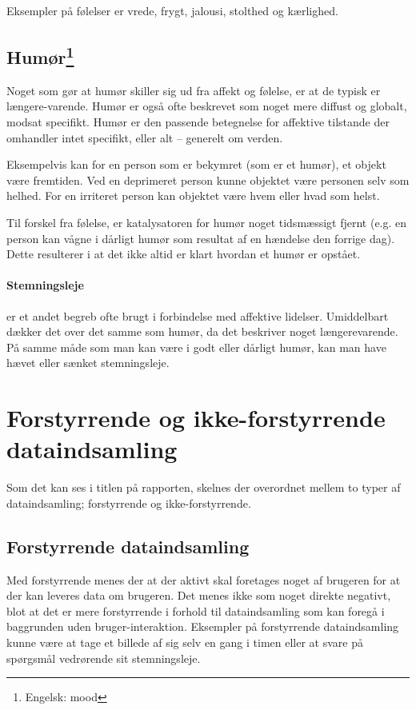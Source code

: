 Eksempler på følelser er vrede, frygt, jalousi, stolthed og kærlighed.\cite[p. 322]{ekkekakis}

\subsection[Humør]{Humør\footnote{Engelsk: mood}}
Noget som gør at humør skiller sig ud fra affekt og følelse, er at de typisk er længere-varende.
Humør er også ofte beskrevet som noget mere diffust og globalt, modsat specifikt.
Humør er den passende betegnelse for affektive tilstande der omhandler intet specifikt, eller alt -- generelt om verden.

Eksempelvis kan for en person som er bekymret (som er et humør), et objekt være fremtiden.
Ved en deprimeret person kunne objektet være personen selv som helhed.
For en irriteret person kan objektet være hvem eller hvad som helst.

Til forskel fra følelse, er katalysatoren for humør noget tidsmæssigt fjernt (e.g. en person kan vågne i dårligt humør som resultat af en hændelse den forrige dag).
Dette resulterer i at det ikke altid er klart hvordan et humør er opstået.\cite[p. 322]{ekkekakis}

\paragraph{Stemningsleje} er et andet begreb ofte brugt i forbindelse med affektive lidelser.
Umiddelbart dækker det over det samme som humør, da det beskriver noget længerevarende.
På samme måde som man kan være i godt eller dårligt humør, kan man have hævet eller sænket stemningsleje.

\section{Forstyrrende og ikke-forstyrrende dataindsamling}
Som det kan ses i titlen på rapporten, skelnes der overordnet mellem to typer af dataindsamling; forstyrrende og ikke-forstyrrende.

\subsection{Forstyrrende dataindsamling}
Med forstyrrende menes der at der aktivt skal foretages noget af brugeren for at der kan leveres data om brugeren.
Det menes ikke som noget direkte negativt, blot at det er mere forstyrrende i forhold til dataindsamling som kan foregå i baggrunden uden bruger-interaktion.
Eksempler på forstyrrende dataindsamling kunne være at tage et billede af sig selv en gang i timen eller at svare på spørgsmål vedrørende sit stemningsleje.

